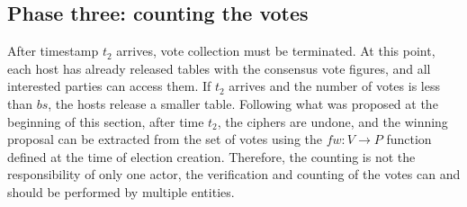 \documentclass[english]{textolivre}
\begin{document}
\subsection{Phase three: counting the votes \label{sec-phase-three}}

After timestamp $t_{2}$ arrives, vote collection must be terminated. At this point, each host has already released tables with the consensus vote figures, and all interested parties can access them. If $t_{2}$ arrives and the number of votes is less than $bs$, the hosts release a smaller table. Following what was proposed at the beginning of this section, after time $t_{2}$, the ciphers are undone, and the winning proposal can be extracted from the set of votes using the $fw:V\longrightarrow P$ function defined at the time of election creation. Therefore, the counting is not the responsibility of only one actor, the verification and counting of the votes can and should be performed by multiple entities.





\end{document}
